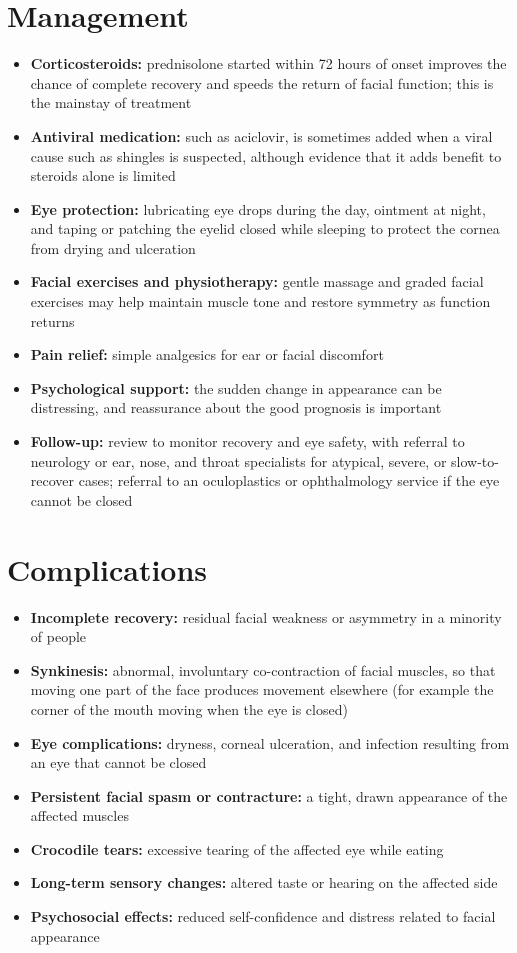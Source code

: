 \section*{Management}
\begin{itemize}
    \item \textbf{Corticosteroids:} prednisolone started within 72 hours of onset improves the chance of complete recovery and speeds the return of facial function; this is the mainstay of treatment
    \item \textbf{Antiviral medication:} such as aciclovir, is sometimes added when a viral cause such as shingles is suspected, although evidence that it adds benefit to steroids alone is limited
    \item \textbf{Eye protection:} lubricating eye drops during the day, ointment at night, and taping or patching the eyelid closed while sleeping to protect the cornea from drying and ulceration
    \item \textbf{Facial exercises and physiotherapy:} gentle massage and graded facial exercises may help maintain muscle tone and restore symmetry as function returns
    \item \textbf{Pain relief:} simple analgesics for ear or facial discomfort
    \item \textbf{Psychological support:} the sudden change in appearance can be distressing, and reassurance about the good prognosis is important
    \item \textbf{Follow-up:} review to monitor recovery and eye safety, with referral to neurology or ear, nose, and throat specialists for atypical, severe, or slow-to-recover cases; referral to an oculoplastics or ophthalmology service if the eye cannot be closed
\end{itemize}

\section*{Complications}
\begin{itemize}
    \item \textbf{Incomplete recovery:} residual facial weakness or asymmetry in a minority of people
    \item \textbf{Synkinesis:} abnormal, involuntary co-contraction of facial muscles, so that moving one part of the face produces movement elsewhere (for example the corner of the mouth moving when the eye is closed)
    \item \textbf{Eye complications:} dryness, corneal ulceration, and infection resulting from an eye that cannot be closed
    \item \textbf{Persistent facial spasm or contracture:} a tight, drawn appearance of the affected muscles
    \item \textbf{Crocodile tears:} excessive tearing of the affected eye while eating
    \item \textbf{Long-term sensory changes:} altered taste or hearing on the affected side
    \item \textbf{Psychosocial effects:} reduced self-confidence and distress related to facial appearance
\end{itemize}


